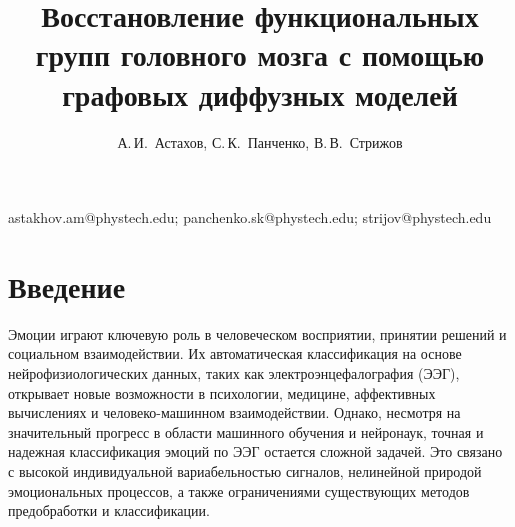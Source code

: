\documentclass[12pt, twoside]{article}
\begin{document}
\title
    {Восстановление функциональных групп головного мозга с помощью графовых диффузных моделей}
\author
    {А.\,И.~Астахов, С.\,К.~Панченко, В.\,В.~Стрижов} 
\email
    {astakhov.am@phystech.edu; panchenko.sk@phystech.edu; strijov@phystech.edu}

\maketitle
\par

\section{Введение}

Эмоции играют ключевую роль в человеческом восприятии, принятии решений и социальном взаимодействии. Их автоматическая классификация на основе нейрофизиологических данных, таких как электроэнцефалография (ЭЭГ), открывает новые возможности в психологии, медицине, аффективных вычислениях и человеко-машинном взаимодействии. Однако, несмотря на значительный прогресс в области машинного обучения и нейронаук, точная и надежная классификация эмоций по ЭЭГ остается сложной задачей. Это связано с высокой индивидуальной вариабельностью сигналов, нелинейной природой эмоциональных процессов, а также ограничениями существующих методов предобработки и классификации.
\end{document}
